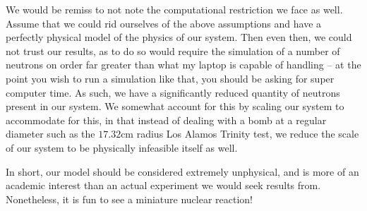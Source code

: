 We would be remiss to not note the computational restriction we face as well. Assume that we could rid ourselves of 
the above assumptions and have a perfectly physical model of the physics of our system. Then even then, we could not trust 
our results, as to do so would require the simulation of a number of neutrons on order far greater than what my laptop is 
capable of handling -- at the point you wish to run a simulation like that, you should be asking for super computer time. As 
such, we have a significantly reduced quantity of neutrons present in our system. We somewhat account for this by scaling our 
system to accommodate for this, in that instead of dealing with a bomb at a regular diameter such as the $17.32\text{cm}$ radius 
Los Alamos Trinity test, we reduce the scale of our system to be physically infeasible itself as well.

In short, our model should be considered extremely unphysical, and is more of an academic interest than an actual 
experiment we would seek results from. Nonetheless, it is fun to see a miniature nuclear reaction!